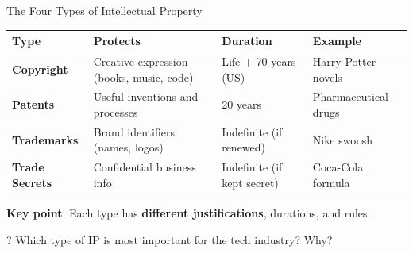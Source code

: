 \documentclass[aspectratio=169]{beamer}
\begin{document}
\begin{frame}{The Four Types of Intellectual Property}
\begin{table}[h]
\centering
\small
\begin{tabular}{>{\bfseries}l p{4cm} l p{3cm}}
\toprule
Type & Protects & Duration & Example \\
\midrule
Copyright & Creative expression (books, music, code) & Life + 70 years (US) & Harry Potter novels \\
Patents & Useful inventions and processes & 20 years & Pharmaceutical drugs \\
Trademarks & Brand identifiers (names, logos) & Indefinite (if renewed) & Nike swoosh \\
Trade Secrets & Confidential business info & Indefinite (if kept secret) & Coca-Cola formula \\
\bottomrule
\end{tabular}
\end{table}

\vspace{0.3cm}
\textbf{Key point}: Each type has \textbf{different justifications}, durations, and rules.

\begin{alertblock}{?}
Which type of IP is most important for the tech industry? Why?
\end{alertblock}
\end{frame}

\end{document}
